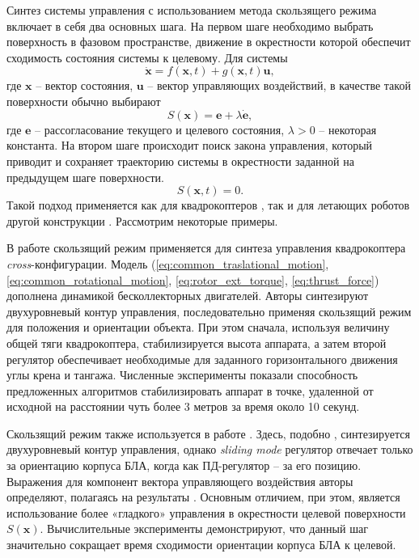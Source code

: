 Синтез системы управления с использованием метода скользящего режима включает в себя два основных шага. На первом шаге необходимо выбрать поверхность в фазовом пространстве, движение в окрестности которой обеспечит сходимость состояния системы к целевому. Для системы
\begin{equation} \label{eq:slide_mode_system}
\dot{\bm x} = f(\bm x, t) + g( \bm x, t) \bm u,
\end{equation}
где $\bm x$ -- вектор состояния, $\bm u$ -- вектор управляющих воздействий, в качестве такой поверхности обычно выбирают \cite{Samir01}
\begin{equation} \label{eq:slide_mode_S}
S(\bm x) = \bm e + \lambda \dot{\bm e},
\end{equation}
где $\bm e$ -- рассогласование текущего и целевого состояния, $\lambda > 0$ -- некоторая константа. На втором шаге происходит поиск закона управления, который приводит и сохраняет траекторию системы в окрестности заданной на предыдущем шаге поверхности.
\begin{equation} \label{eq:slide_mode_on_S}
S(\bm x,t) = 0.
\end{equation}
Такой подход применяется как для квадрокоптеров \cite{Stevanovic01, Lebedev01, Xu01}, так и для летающих роботов другой конструкции \cite{Yih01, Zhu01}. Рассмотрим некоторые примеры.

В работе \cite{Samir01} скользящий режим применяется для синтеза управления квадрокоптера \textit{cross}-конфигурации.
Модель (\ref{eq:common_traslational_motion}, \ref{eq:common_rotational_motion}, \ref{eq:rotor_ext_torque}, \ref{eq:thrust_force}) дополнена динамикой бесколлекторных двигателей.
Авторы синтезируют двухуровневый контур управления, последовательно применяя скользящий режим для положения и ориентации объекта. При этом сначала, используя величину общей тяги квадрокоптера, стабилизируется высота аппарата, а затем второй регулятор обеспечивает необходимые для заданного горизонтального движения углы крена и тангажа. Численные эксперименты показали способность предложенных алгоритмов стабилизировать аппарат в точке, удаленной от исходной на расстоянии чуть более 3 метров за время около 10 секунд.

Скользящий режим также используется в работе \cite{Runcharoon01}. Здесь, подобно \cite{Samir01}, синтезируется двухуровневый контур управления, однако \textit{sliding mode} регулятор отвечает только за ориентацию корпуса БЛА, когда как ПД-регулятор -- за его позицию. Выражения для компонент вектора управляющего воздействия авторы определяют, полагаясь на результаты \cite{Slotine01}. Основным отличием, при этом, является использование более «гладкого» управления в окрестности целевой поверхности $S(\bm x)$. Вычислительные эксперименты демонстрируют, что данный шаг значительно сокращает время сходимости  ориентации корпуса БЛА к целевой. 

